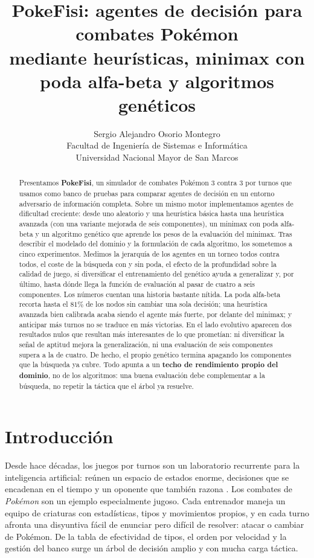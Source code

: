 \documentclass[11pt]{article}
\title{PokeFisi: agentes de decisión para combates Pokémon \\
       mediante heurísticas, minimax con poda alfa-beta y algoritmos genéticos}
\author{Sergio Alejandro Osorio Montegro \\
  Facultad de Ingeniería de Sistemas e Informática \\
  Universidad Nacional Mayor de San Marcos}
\begin{document}
\maketitle

\begin{abstract}
Presentamos \textbf{PokeFisi}, un simulador de combates Pokémon 3 contra 3 por
turnos que usamos como banco de pruebas para comparar agentes de decisión en un
entorno adversario de información completa. Sobre un mismo motor implementamos
agentes de dificultad creciente: desde uno aleatorio y una heurística básica hasta
una heurística avanzada (con una variante mejorada de seis componentes), un
minimax con poda alfa-beta y un algoritmo genético que aprende los pesos de la
evaluación del minimax. Tras describir el modelado del dominio y la formulación de
cada algoritmo, los sometemos a cinco experimentos. Medimos la jerarquía de los
agentes en un torneo todos contra todos, el coste de la búsqueda con y sin poda,
el efecto de la profundidad sobre la calidad de juego, si diversificar el
entrenamiento del genético ayuda a generalizar y, por último, hasta dónde llega la
función de evaluación al pasar de cuatro a seis componentes. Los números cuentan
una historia bastante nítida. La poda alfa-beta recorta hasta el $81\%$ de los
nodos sin cambiar una sola decisión; una heurística avanzada bien calibrada acaba
siendo el agente más fuerte, por delante del minimax; y anticipar más turnos no se
traduce en más victorias. En el lado evolutivo aparecen dos resultados nulos que
resultan más interesantes de lo que prometían: ni diversificar la señal de aptitud
mejora la generalización, ni una evaluación de seis componentes supera a la de
cuatro. De hecho, el propio genético termina apagando los componentes que la
búsqueda ya cubre. Todo apunta a un \textbf{techo de rendimiento propio del
dominio}, no de los algoritmos: una buena evaluación debe complementar a la
búsqueda, no repetir la táctica que el árbol ya resuelve.
\end{abstract}

\section{Introducción}

Desde hace décadas, los juegos por turnos son un laboratorio recurrente para la
inteligencia artificial: reúnen un espacio de estados enorme, decisiones que se
encadenan en el tiempo y un oponente que también razona
\citep{shannon1950,russell2020}. Los combates de \emph{Pokémon} son un ejemplo
especialmente jugoso. Cada entrenador maneja un equipo de criaturas con
estadísticas, tipos y movimientos propios, y en cada turno afronta una disyuntiva
fácil de enunciar pero difícil de resolver: atacar o cambiar de Pokémon. De la
tabla de efectividad de tipos, el orden por velocidad y la gestión del banco surge
un árbol de decisión amplio y con mucha carga táctica.
\end{document}

